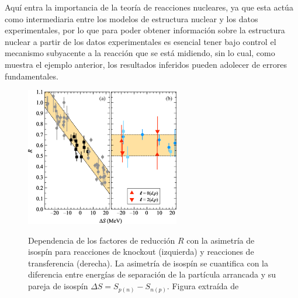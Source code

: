 \documentclass[a4paper,12pt,twoside]{article}
\begin{document}
Aquí entra la importancia de la teoría de reacciones nucleares, ya que esta actúa como intermediaria entre los modelos de estructura nuclear y los datos experimentales, por lo que para poder obtener información sobre la estructura nuclear a partir de los datos experimentales es esencial tener bajo control el mecanismo subyacente a la reacción que se está midiendo, sin lo cual, como muestra el ejemplo anterior, los resultados inferidos pueden adolecer de errores fundamentales.

\begin{figure}
\begin{center}
\includegraphics[width=0.6\textwidth]{kay22.png}
\label{fig:gade}
\caption{Dependencia de los factores de reducción $R$ con la asimetría de isospín para reacciones de knockout (izquierda) y reacciones de transferencia (derecha). La asimetría de isospín se cuantifica con la diferencia entre energías de separación de la partícula arrancada y su pareja de isospín $\Delta S=S_{p(n)}-S_{n(p)}$. Figura extraída de \cite{Kay22}}
\end{center}
\end{figure}
\end{document}
